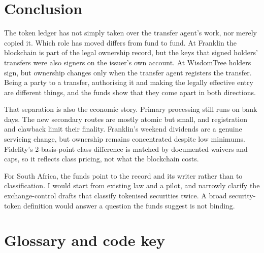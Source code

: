 \documentclass[12pt,a4paper]{article}
\begin{document}
\section{Conclusion}\label{sec:conclusion}
The token ledger has not simply taken over the transfer agent's work, nor merely copied it. Which role has moved differs from fund to fund. At Franklin the blockchain is part of the legal ownership record, but the keys that signed holders' transfers were also signers on the issuer's own account. At WisdomTree holders sign, but ownership changes only when the transfer agent registers the transfer. Being a party to a transfer, authorising it and making the legally effective entry are different things, and the funds show that they come apart in both directions.

That separation is also the economic story. Primary processing still runs on bank days. The new secondary routes are mostly atomic but small, and registration and clawback limit their finality. Franklin's weekend dividends are a genuine servicing change, but ownership remains concentrated despite low minimums. Fidelity's 2-basis-point class difference is matched by documented waivers and caps, so it reflects class pricing, not what the blockchain costs.

For South Africa, the funds point to the record and its writer rather than to classification. I would start from existing law and a pilot, and narrowly clarify the exchange-control drafts that classify tokenised securities twice. A broad security-token definition would answer a question the funds suggest is not binding.

\clearpage
{}
{}
{
}

\newpage
\appendix

\section{Glossary and code key}\label{app:glossary}
\end{document}
